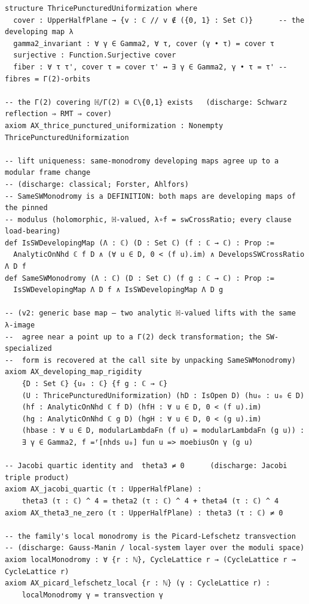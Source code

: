 \documentclass{article}
\theoremstyle{plain}
\theoremstyle{definition}
\numberwithin{equation}{section}
\begin{document}
\begin{Verbatim}
structure ThricePuncturedUniformization where
  cover : UpperHalfPlane → {v : ℂ // v ∉ ({0, 1} : Set ℂ)}      -- the developing map λ
  gamma2_invariant : ∀ γ ∈ Gamma2, ∀ τ, cover (γ • τ) = cover τ
  surjective : Function.Surjective cover
  fiber : ∀ τ τ', cover τ = cover τ' ↔ ∃ γ ∈ Gamma2, γ • τ = τ' -- fibres = Γ(2)-orbits

-- the Γ(2) covering ℍ/Γ(2) ≅ ℂ\{0,1} exists   (discharge: Schwarz reflection ⇒ RMT ⇒ cover)
axiom AX_thrice_punctured_uniformization : Nonempty ThricePuncturedUniformization

-- lift uniqueness: same-monodromy developing maps agree up to a modular frame change
-- (discharge: classical; Forster, Ahlfors)
-- SameSWMonodromy is a DEFINITION: both maps are developing maps of the pinned
-- modulus (holomorphic, ℍ-valued, λ∘f = swCrossRatio; every clause load-bearing)
def IsSWDevelopingMap (Λ : ℂ) (D : Set ℂ) (f : ℂ → ℂ) : Prop :=
  AnalyticOnNhd ℂ f D ∧ (∀ u ∈ D, 0 < (f u).im) ∧ DevelopsSWCrossRatio Λ D f
def SameSWMonodromy (Λ : ℂ) (D : Set ℂ) (f g : ℂ → ℂ) : Prop :=
  IsSWDevelopingMap Λ D f ∧ IsSWDevelopingMap Λ D g

-- (v2: generic base map — two analytic ℍ-valued lifts with the same λ-image
--  agree near a point up to a Γ(2) deck transformation; the SW-specialized
--  form is recovered at the call site by unpacking SameSWMonodromy)
axiom AX_developing_map_rigidity
    {D : Set ℂ} {u₀ : ℂ} {f g : ℂ → ℂ}
    (U : ThricePuncturedUniformization) (hD : IsOpen D) (hu₀ : u₀ ∈ D)
    (hf : AnalyticOnNhd ℂ f D) (hfH : ∀ u ∈ D, 0 < (f u).im)
    (hg : AnalyticOnNhd ℂ g D) (hgH : ∀ u ∈ D, 0 < (g u).im)
    (hbase : ∀ u ∈ D, modularLambdaFn (f u) = modularLambdaFn (g u)) :
    ∃ γ ∈ Gamma2, f =ᶠ[nhds u₀] fun u => moebiusOn γ (g u)

-- Jacobi quartic identity and  theta3 ≠ 0      (discharge: Jacobi triple product)
axiom AX_jacobi_quartic (τ : UpperHalfPlane) :
    theta3 (τ : ℂ) ^ 4 = theta2 (τ : ℂ) ^ 4 + theta4 (τ : ℂ) ^ 4
axiom AX_theta3_ne_zero (τ : UpperHalfPlane) : theta3 (τ : ℂ) ≠ 0

-- the family's local monodromy is the Picard-Lefschetz transvection
-- (discharge: Gauss-Manin / local-system layer over the moduli space)
axiom localMonodromy : ∀ {r : ℕ}, CycleLattice r → (CycleLattice r → CycleLattice r)
axiom AX_picard_lefschetz_local {r : ℕ} (γ : CycleLattice r) :
    localMonodromy γ = transvection γ

\end{Verbatim}
\end{document}
